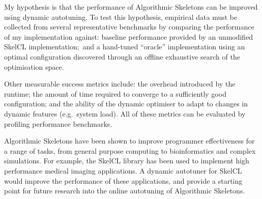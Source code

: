 My hypothesis is that the performance of Algorithmic Skeletons can be
improved using dynamic autotuning. To test this hypothesis, empirical
data must be collected from several representative benchmarks by
comparing the performance of my implementation against: baseline
performance provided by an unmodified SkelCL implementation;\ and a
hand-tuned ``oracle'' implementation using an optimal configuration
discovered through an offline exhaustive search of the optimisation
space.

Other measurable success metrics include: the overhead introduced by
the runtime; the amount of time required to converge to a sufficiently
good configuration; and the ability of the dynamic optimiser to adapt
to changes in dynamic features (e.g.\ system load). All of these
metrics can be evaluated by profiling performance benchmarks.

Algorithmic Skeletons have been shown to improve programmer
effectiveness for a range of tasks, from general purpose computing to
bioinformatics and complex simulations. For example, the SkelCL
library has been used to implement high performance medical imaging
applications. A dynamic autotuner for SkelCL would improve the
performance of these applications, and provide a starting point for
future research into the online autotuning of Algorithmic Skeletons.



